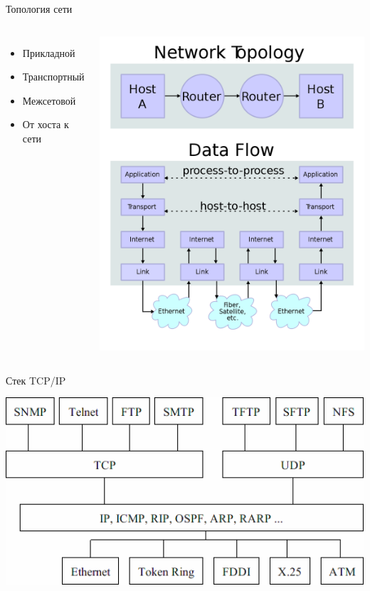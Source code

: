 \begin{frame}{Топология сети}
	\begin{columns}
	\vspace{5em}
	\begin{itemize}
		\item Прикладной
		\item Транспортный
		\item Межсетовой
		\item От хоста к сети
	\end{itemize}

	\begin{center}
		\includegraphics[height=0.9\textheight]{03-1000px-IP_stack_connections.png}
	\end{center}
	\end{columns}
\end{frame}

\begin{frame}{Стек TCP/IP}
	\begin{center}
		\includegraphics[width=1\textwidth]{03-TCP_IP.png}
	\end{center}
\end{frame}


